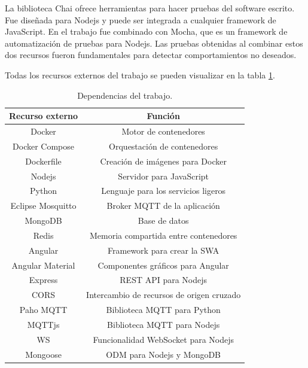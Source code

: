 La biblioteca Chai ofrece herramientas para hacer pruebas del software escrito.
Fue diseñada para Nodejs y puede ser integrada a cualquier framework de JavaScript.
En el trabajo fue combinado con Mocha, que es un framework de automatización de pruebas para Nodejs.
Las pruebas obtenidas al combinar estos dos recursos fueron fundamentales para detectar comportamientos no deseados.

Todas los recursos externos del trabajo se pueden visualizar en la tabla \ref{tab:dependencias}.

\begin{table}[h]
	\centering
	\caption{\label{tab:dependencias}Dependencias del trabajo.}
	\begin{tabular}{c c}
		\toprule
		\textbf{Recurso externo}      & \textbf{Función}                          \\
		\midrule
		Docker             & Motor de contenedores                     \\
		Docker Compose     & Orquestación de contenedores              \\
		Dockerfile         & Creación de imágenes para Docker          \\
		Nodejs             & Servidor para JavaScript                  \\
		Python             & Lenguaje para los servicios ligeros       \\
		Eclipse Mosquitto  & Broker MQTT de la aplicación              \\
		MongoDB            & Base de datos                             \\
		Redis              & Memoria compartida entre contenedores     \\
		Angular            & Framework para crear la SWA               \\
		Angular Material   & Componentes gráficos para Angular         \\
		Express            & REST API para Nodejs                      \\
		CORS               & Intercambio de recursos de origen cruzado \\
		Paho MQTT          & Biblioteca MQTT para Python               \\
		MQTTjs             & Biblioteca MQTT para Nodejs               \\
		WS                 & Funcionalidad WebSocket para Nodejs       \\
		Mongoose           & ODM para Nodejs y MongoDB                 \\

\end{tabular}
\end{table}
